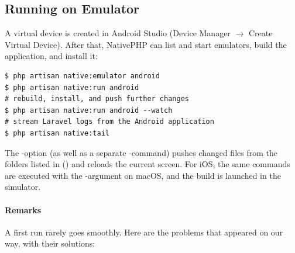 \subsection{Running on Emulator}

A virtual device is created in Android Studio (Device Manager $\rightarrow$ Create Virtual
Device). After that, NativePHP can list and start emulators, build the application, and install
it:

\begin{lstlisting}[language=terminal]
$ php artisan native:emulator android
$ php artisan native:run android
# rebuild, install, and push further changes
$ php artisan native:run android --watch
# stream Laravel logs from the Android application
$ php artisan native:tail
\end{lstlisting}

\noindent The -option (as well as a separate -command) pushes changed
files from the folders listed in  () and
reloads the current screen. For iOS, the same commands are executed with the -argument on
macOS, and the build is launched in the simulator.

\paragraph{Remarks} A first run rarely goes smoothly. Here are the problems that appeared on our
way, with their solutions:

